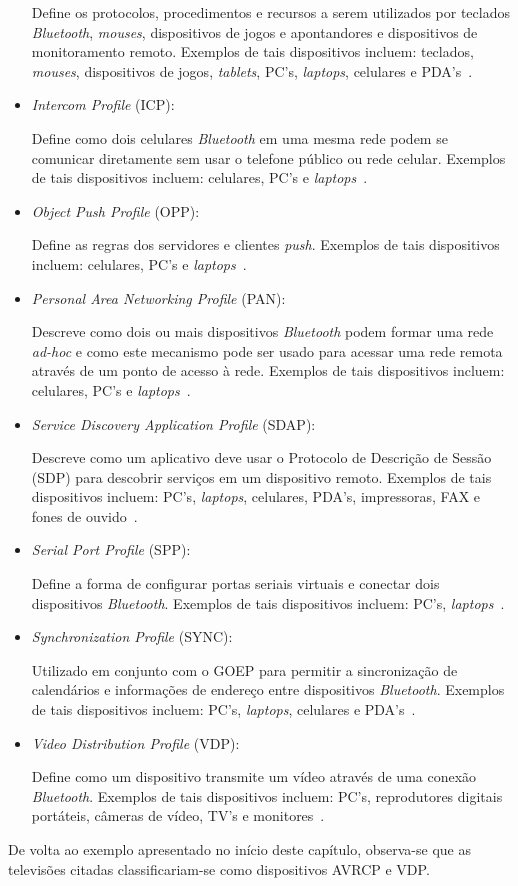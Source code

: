 \begin{itemize}
	Define os protocolos, procedimentos e recursos a serem utilizados por teclados \emph{Bluetooth}, \emph{mouses}, dispositivos de jogos e apontandores e dispositivos de monitoramento remoto. Exemplos de tais dispositivos incluem: teclados, \emph{mouses}, dispositivos de jogos, \emph{tablets}, PC's, \emph{laptops}, celulares e PDA's~\cite{bluetoothprofilesHID}.
	\item \emph{Intercom Profile} (ICP): 

	Define como dois celulares \emph{Bluetooth} em uma mesma rede podem se comunicar diretamente sem usar o telefone público ou rede celular. Exemplos de tais dispositivos incluem: celulares, PC's e \emph{laptops}~\cite{bluetoothprofilesICP}.
	\item \emph{Object Push Profile} (OPP): 

	Define as regras dos servidores e clientes \emph{push}. Exemplos de tais dispositivos incluem: celulares, PC's e \emph{laptops}~\cite{bluetoothprofilesOPP}.
	\item \emph{Personal Area Networking Profile} (PAN): 

	Descreve como dois ou mais dispositivos \emph{Bluetooth} podem formar uma rede \emph{ad-hoc} e como este mecanismo pode ser usado para acessar uma rede remota através de um ponto de acesso à rede. Exemplos de tais dispositivos incluem: celulares, PC's e \emph{laptops}~\cite{bluetoothprofilesPAN}.
	\item \emph{Service Discovery Application Profile} (SDAP): 

	Descreve como um aplicativo deve usar o Protocolo de Descrição de Sessão (SDP) para descobrir serviços em um dispositivo remoto. Exemplos de tais dispositivos incluem: PC's, \emph{laptops}, celulares, PDA's, impressoras, FAX e fones de ouvido~\cite{bluetoothprofilesSDAP}.
	\item \emph{Serial Port Profile} (SPP): 

	Define a forma de configurar portas seriais virtuais e conectar dois dispositivos \emph{Bluetooth}. Exemplos de tais dispositivos incluem: PC's, \emph{laptops}~\cite{bluetoothprofilesSPP}.
	\item \emph{Synchronization Profile} (SYNC): 

	Utilizado em conjunto com o GOEP para permitir a sincronização de calendários e informações de endereço entre dispositivos \emph{Bluetooth}. Exemplos de tais dispositivos incluem: PC's, \emph{laptops}, celulares e PDA's~\cite{bluetoothprofilesSYNC}.
	\item \emph{Video Distribution Profile} (VDP): 

	Define como um dispositivo transmite um vídeo através de uma conexão \emph{Bluetooth}. Exemplos de tais dispositivos incluem: PC's, reprodutores digitais portáteis, câmeras de vídeo, TV's e monitores~\cite{bluetoothprofilesVDP}.
\end{itemize}

De volta ao exemplo apresentado no início deste capítulo, observa-se que as televisões citadas classificariam-se como dispositivos AVRCP e VDP.